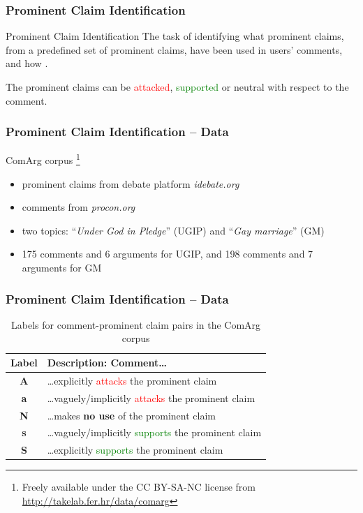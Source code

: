 \documentclass{beamer}
\newcommand{\pro}[1]{\textcolor{green}{#1}}
\newcommand{\con}[1]{\textcolor{red}{#1}}
\begin{document}
\begin{frame}
\frametitle{Prominent Claim Identification}
	\begin{block}{Prominent Claim Identification}
The task of identifying what prominent claims, from a predefined set of
prominent claims, have been used in users' comments, and how \cite{boltuzic2014back}. 
\\
\vspace{0.5cm}

The prominent claims can be \textcolor{red}{attacked}, 
\textcolor{green}{supported} or neutral with respect to the comment.
	\end{block}
\end{frame}

\begin{frame}
\frametitle{Prominent Claim Identification -- Data}

ComArg corpus \footnote{Freely available under the CC BY-SA-NC license from
\url{http://takelab.fer.hr/data/comarg}}

\begin{itemize}
	\item prominent claims from debate platform \textit{idebate.org}
	\item comments from \textit{procon.org}
	\item two topics: ``\textit{Under God in Pledge}'' (UGIP) and 
``\textit{Gay marriage}'' (GM)
	\item 175
comments and 6 arguments for UGIP, and 198 comments and 7 arguments for GM
\end{itemize}

\end{frame}

\begin{frame}
\frametitle{Prominent Claim Identification -- Data}

\begin{table}
\centering
{\small
\begin{tabular}{cl}
\toprule
Label & Description: Comment\dots \\
\midrule
\textbf{A} & \dots explicitly \con{attacks} the prominent claim \\
\textbf{a} & \dots vaguely/implicitly \con{attacks} the prominent claim \\
\textbf{N} & \dots makes \textbf{no use} of the prominent claim \\
\textbf{s} & \dots vaguely/implicitly \pro{supports} the prominent claim \\
\textbf{S} & \dots explicitly \pro{supports} the prominent claim \\
\bottomrule
\end{tabular}
}
\caption{Labels for comment-prominent claim pairs in the ComArg corpus}
\label{tab:comarg-labels}
\end{table}
\end{frame}
\end{document}
